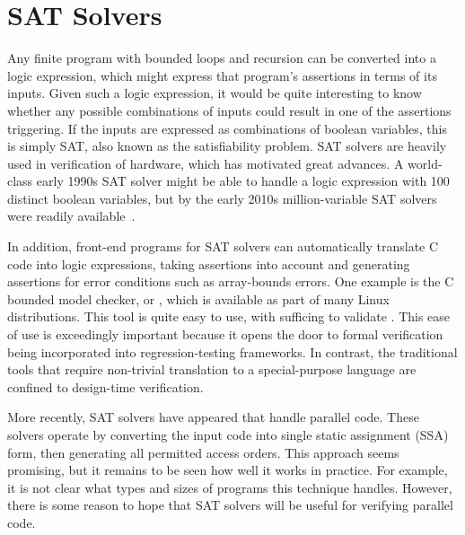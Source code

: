 
\section{SAT Solvers}
\label{sec:formal:SAT Solvers}

Any finite program with bounded loops and recursion can be converted
into a logic expression, which might express that program's assertions
in terms of its inputs.
Given such a logic expression, it would be quite interesting to know
whether any possible combinations of inputs could result in one of
the assertions triggering.
If the inputs are expressed as combinations of boolean variables,
this is simply SAT, also known as the satisfiability problem.
SAT solvers are heavily used in verification of hardware, which has
motivated great advances.
A world-class early 1990s SAT solver might be able to handle a logic
expression with 100 distinct boolean variables, but by the early 2010s
million-variable SAT solvers were readily
available~\cite{Kroening:2008:DPA:1391237}.

In addition, front-end programs for SAT solvers can automatically translate
C code into logic expressions, taking assertions into account and generating
assertions for error conditions such as array-bounds errors.
One example is the C bounded model checker, or , which is
available as part of many Linux distributions.
This tool is quite easy to use, with  sufficing to
validate .
This ease of use is exceedingly important because it opens the door
to formal verification being incorporated into regression-testing
frameworks.
In contrast, the traditional tools that require non-trivial translation
to a special-purpose language are confined to design-time verification.

More recently, SAT solvers have appeared that handle parallel code.
These solvers operate by converting the input code into single static
assignment (SSA) form, then generating all permitted access orders.
This approach seems promising, but it remains to be seen how well
it works in practice.
For example, it is not clear what types and sizes of programs this
technique handles.
However, there is some reason to hope that SAT solvers will be useful
for verifying parallel code.
